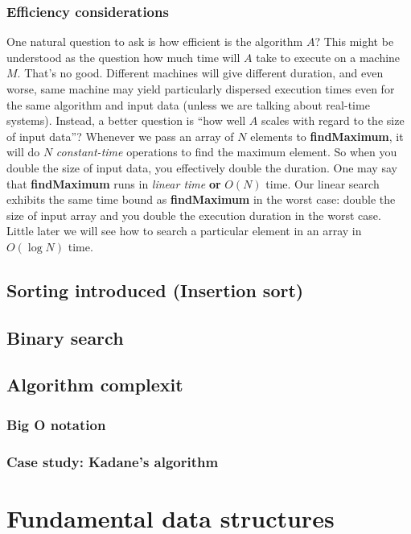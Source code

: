\documentclass[oneside]{book}
\begin{document}
\subsection{Efficiency considerations}
One natural question to ask is how efficient is the algorithm $A$? This might be understood as the question how much time will $A$ take to execute on a machine $M$. That's no good. Different machines will give different duration, and even worse, same machine may yield particularly dispersed execution times even for the same algorithm and input data (unless we are talking about real-time systems). Instead, a better question is ``how well $A$ scales with regard to the size of input data''? Whenever we pass an array of $N$ elements to \textbf{findMaximum}, it will do $N$ \textit{constant-time} operations to find the maximum element. So when you double the size of input data, you effectively double the duration. One may say that \textbf{findMaximum} runs in \textit{linear time} \textbf{or} $O(N)$ time. Our linear search exhibits the same time bound as \textbf{findMaximum} in the worst case: double the size of input array and you double the execution duration in the worst case. Little later we will see how to search a particular element in an array in $O(\log N)$ time.

\section{Sorting introduced (Insertion sort)}

\section{Binary search}

\section{Algorithm complexit}

\subsection{Big O notation}

\subsection{Case study: Kadane's algorithm}

\chapter{Fundamental data structures}
\end{document}
